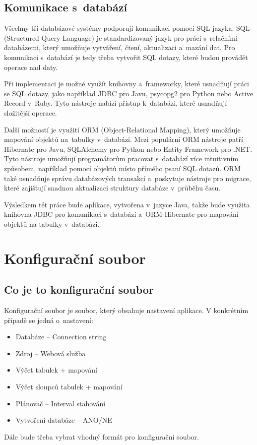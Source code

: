 \documentclass[czech, kiv, ba, he, iso690auyr, pdf]{fasthesis}
\begin{document}
\section{Komunikace s~databází}
Všechny tři databázové systémy podporují komunikaci pomocí SQL jazyka.
SQL (Structured Query Language) je standardizovaný jazyk pro práci s~relačními databázemi,
který umožňuje vytváření, čtení, aktualizaci a~mazání dat.
Pro komunikaci s~databází je tedy třeba vytvořit SQL dotazy, které budou provádět operace nad daty.

Při implementaci je možné využít knihovny a~frameworky, které usnadňují práci se SQL dotazy, 
jako například JDBC pro Javu, psycopg2 pro Python nebo Active Record v~Ruby. 
Tyto nástroje nabízí přístup k~databázi, které usnadňují složitější operace.

Další možností je využití ORM (Object-Relational Mapping), který umožňuje mapování objektů na~tabulky v~databázi.
Mezi populární ORM nástroje patří Hibernate pro Javu, SQLAlchemy pro Python nebo Entity Framework pro .NET. 
Tyto nástroje umožňují programátorům pracovat s~databází více intuitivním způsobem, například pomocí objektů 
místo přímého psaní SQL dotazů. ORM také usnadňuje správu databázových transakcí a~poskytuje nástroje pro migrace, 
které zajišťují snadnou aktualizaci struktury databáze v~průběhu času.

Výsledkem tét práce bude aplikace, vytvořena v~jazyce Java, takže bude využita knihovna JDBC pro komunikaci 
s~databází a~ORM Hibernate pro mapování objektů na tabulky v~databázi.

\chapter{Konfigurační soubor}
\section{Co je to konfigurační soubor}
Konfigurační soubor je soubor, který obsahuje nastavení aplikace.
V konkrétním případě se jedná o~nastavení:
\begin{itemize}
    \item Databáze -- Connection string
    \item Zdroj -- Webová služba
    \item Výčet tabulek + mapování
    \item Výčet sloupců tabulek + mapování
    \item Plánovač -- Interval stahování
    \item Vytvoření databáze -- ANO/NE
\end{itemize}
Dále bude třeba vybrat vhodný formát pro konfigurační soubor.
\end{document}
